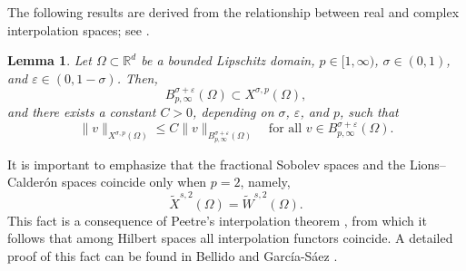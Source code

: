 \documentclass[]{amsart}
\newtheorem{Lemma}[theorem]{Lemma}
\newtheorem{proposition}[theorem]{Proposition}
\theoremstyle{definition}
\theoremstyle{definition}
\theoremstyle{remark}
\newtheorem{remark}[theorem]{Remark}
\numberwithin{equation}{section}
\begin{document}
	The following results are derived from the relationship between real and complex interpolation spaces; see \cite[Theorem 3.1]{peetre1969transformation}.
	\begin{Lemma}
		\label{Regularidad: Inmersión Lions Calderon Besov}
		Let \( \Omega \subset \mathbb{R}^d \) be a bounded Lipschitz domain, \( p \in [1, \infty) \), \( \sigma \in (0,1) \), and \( \varepsilon \in (0,1 - \sigma) \). Then,
		\[
		B_{p, \infty}^{\sigma + \varepsilon}(\Omega) \subset X^{\sigma,p}(\Omega),
		\]
		and there exists a constant \( C > 0 \), depending on \( \sigma \), \( \varepsilon \), and \( p \), such that
		\[
		\|v\|_{X^{\sigma,p}(\Omega)} \leq C \|v\|_{B_{p, \infty}^{\sigma + \varepsilon}(\Omega)} \quad \text{for all } v \in B_{p, \infty}^{\sigma + \varepsilon}(\Omega).
		\]
	\end{Lemma}
%
%
It is important to emphasize that the fractional Sobolev spaces and the Lions–Calderón spaces coincide only when \( p = 2 \), namely,
\[
	\widetilde{X}^{s,2}(\Omega) = \widetilde{W}^{s,2}(\Omega).
\]
This fact is a consequence of
Peetre’s interpolation theorem \cite[Theorem 3.1]{peetre1969transformation}, from which it follows that among Hilbert spaces all interpolation functors coincide. A detailed proof of this fact can be found in Bellido and García-Sáez \cite[Theorem 3.23]{bellido2025bessel}.
\end{document}
